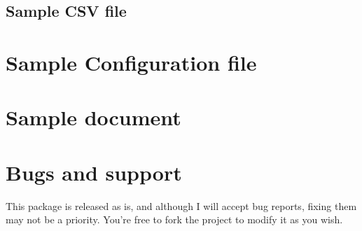 \documentclass[11pt]{article}
\begin{document}
\subsection{Sample CSV file}

\clearpage
\section{Sample Configuration file}


\section{Sample document}

\section{Bugs and support}
This package is released as is, and although I will accept bug reports, fixing them may not be a priority. You're free to fork the project to modify it as you wish.



\end{document}

